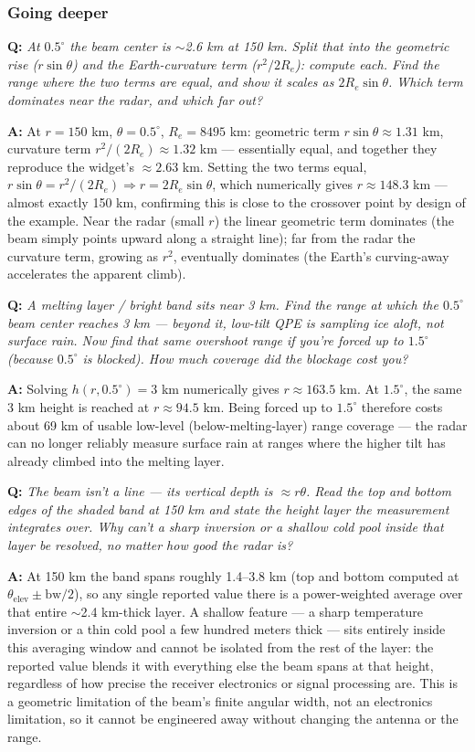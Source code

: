 \documentclass[11pt]{article}
\newenvironment{qa}[1]{\par\noindent\textbf{\color{qgray}Q: }\emph{#1}\par\noindent\textbf{A: }}{\par\vspace{6pt}}
\newcommand{\tier}[1]{\subsubsection*{#1}}
\begin{document}
\tier{Going deeper}
\begin{qa}{At $0.5^\circ$ the beam center is $\sim$2.6 km at 150 km. Split that into the geometric rise ($r\sin\theta$) and the Earth-curvature term ($r^2/2R_e$): compute each. Find the range where the two terms are equal, and show it scales as $2R_e\sin\theta$. Which term dominates near the radar, and which far out?}
At $r=150$ km, $\theta=0.5^\circ$, $R_e=8495$ km: geometric term $r\sin\theta\approx1.31$ km, curvature term $r^2/(2R_e)\approx1.32$ km --- essentially equal, and together they reproduce the widget's $\approx2.63$ km. Setting the two terms equal, $r\sin\theta = r^2/(2R_e)\Rightarrow r=2R_e\sin\theta$, which numerically gives $r\approx148.3$ km --- almost exactly 150 km, confirming this is close to the crossover point by design of the example. Near the radar (small $r$) the linear geometric term dominates (the beam simply points upward along a straight line); far from the radar the curvature term, growing as $r^2$, eventually dominates (the Earth's curving-away accelerates the apparent climb).
\end{qa}
\begin{qa}{A melting layer / bright band sits near 3 km. Find the range at which the $0.5^\circ$ beam center reaches 3 km --- beyond it, low-tilt QPE is sampling ice aloft, not surface rain. Now find that same overshoot range if you're forced up to $1.5^\circ$ (because $0.5^\circ$ is blocked). How much coverage did the blockage cost you?}
Solving $h(r,0.5^\circ)=3$ km numerically gives $r\approx163.5$ km. At $1.5^\circ$, the same 3 km height is reached at $r\approx94.5$ km. Being forced up to $1.5^\circ$ therefore costs about 69 km of usable low-level (below-melting-layer) range coverage --- the radar can no longer reliably measure surface rain at ranges where the higher tilt has already climbed into the melting layer.
\end{qa}
\begin{qa}{The beam isn't a line --- its vertical depth is $\approx r\theta$. Read the top and bottom edges of the shaded band at 150 km and state the height layer the measurement integrates over. Why can't a sharp inversion or a shallow cold pool inside that layer be resolved, no matter how good the radar is?}
At 150 km the band spans roughly 1.4--3.8 km (top and bottom computed at $\theta_{\mathrm{elev}}\pm\mathrm{bw}/2$), so any single reported value there is a power-weighted average over that entire $\sim$2.4 km-thick layer. A shallow feature --- a sharp temperature inversion or a thin cold pool a few hundred meters thick --- sits entirely inside this averaging window and cannot be isolated from the rest of the layer: the reported value blends it with everything else the beam spans at that height, regardless of how precise the receiver electronics or signal processing are. This is a geometric limitation of the beam's finite angular width, not an electronics limitation, so it cannot be engineered away without changing the antenna or the range.
\end{qa}
\end{document}
